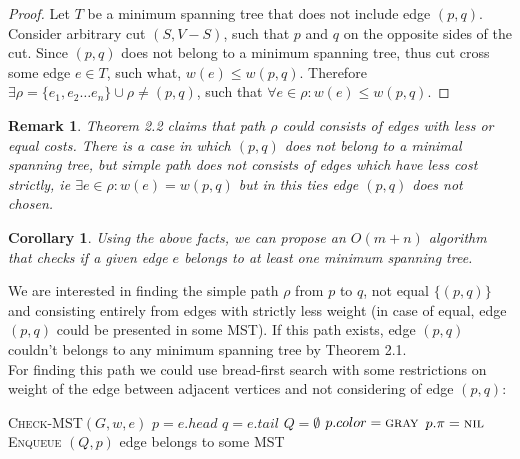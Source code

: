 \documentclass{article}
\let\oldnl\nl
\newcommand{\nonl}{\renewcommand{\nl}{\let\nl\oldnl}}
\newtheorem*{remark}{Remark}
\newtheorem{corollary}[theorem]{Corollary}
\begin{document}
\begin{proof}
  Let $T$ be a minimum spanning tree that does not include edge $(p,q)$.
  Consider arbitrary cut $(S, V - S)$, such that $p$ and $q$ on the opposite
  sides of the cut. Since $(p,q)$ does not belong to a minimum spanning tree,
  thus cut cross some edge $e \in T$, such what, $w(e) \leq w(p,q)$. Therefore
  $\exists \rho = \{e_1, e_2 \dots e_n\} \cup \rho \neq (p,q) $,   
  such that $\forall e \in \rho : w(e) \leq w(p,q)$.
\end{proof}

\begin{remark}
  Theorem 2.2 claims that path $\rho$ could consists of edges with less or equal
  costs. There is a case in which $(p,q)$ does not belong to a minimal spanning
  tree, but simple path does not consists of edges which have less cost
  strictly, ie $\exists e \in \rho : w(e) = w(p,q)$ but in this ties edge
  $(p,q)$ does not chosen.
\end{remark}
  
\begin{corollary}
Using the above facts, we can propose an $O(m+n)$ algorithm that checks if a
given edge $e$ belongs to at least one minimum spanning tree.
\end{corollary}

We are interested in finding the simple path $\rho$ from $p$ to $q$, not equal
$\{(p,q)\}$ and consisting 
entirely from edges with strictly less weight (in case of equal, edge $(p,q)$ could
be presented in some MST). If this path exists, edge $(p,q)$ couldn't
belongs to any minimum spanning tree by Theorem 2.1.\\

For finding this path we could use bread-first search with some restrictions on
weight of the edge between adjacent vertices and not considering of edge $(p,q)$:\\

\IncMargin{1em}
\begin{algorithm}[H]
  \SetAlgoNoEnd\SetAlgoNoLine
  \SetNlSkip{1.5em}
  \DontPrintSemicolon

  \nonl \textsc{Check-MST}$(G,w,e)$\;
  $p = e.head$\;
  $q = e.tail$\;
  $Q = \emptyset$\;
  $p.color = \textsc{gray}$\;
  $p.\pi = \textsc{nil}$\;
  \textsc{Enqueue} $(Q,p)$\;
  \Return edge belongs to some MST\;
\end{algorithm}
\end{document}
